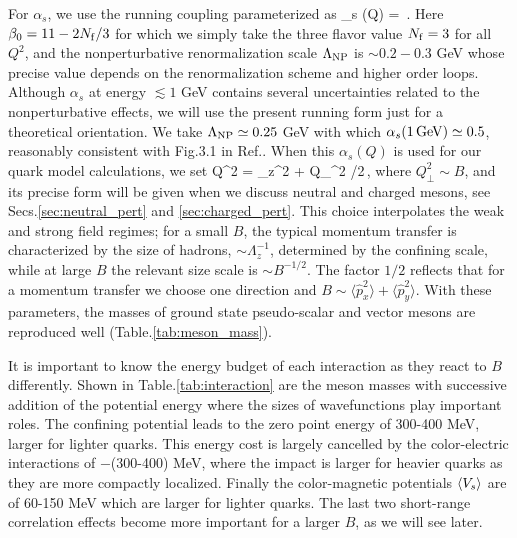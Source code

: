  For $\alpha_s$, we use the running coupling parameterized as
%
\beq
\alpha_s (Q) =  %
 \,.
\eeq
%
Here $\beta_0 = 11- 2N_{\rm f}/3$ for which we simply take the three flavor value $N_{\rm f}=3$ for all $Q^2$, 
and the nonperturbative renormalization scale $\Lambda_{\rm NP}$ is $\sim 0.2-0.3$ GeV whose precise value depends on the renormalization scheme
and higher order loops.
Although $\alpha_s$ at energy $\lesssim 1$ GeV contains several uncertainties related to the nonperturbative effects, 
we will use the present running form just for a theoretical orientation.
We take $\Lambda_{\rm NP} \simeq 0.25$ GeV with which $\alpha_s(1\,{\rm GeV}) \simeq 0.5$, reasonably consistent with Fig.3.1 in Ref.\cite{Deur:2016tte}.
When this $\alpha_s(Q)$ is used for our quark model calculations,
we set
%
\beq
 Q^2 = \Lambda_z^2 + Q_\perp^2 /2\,,
 \label{eq:Q2}
\eeq
%
where $Q^2_\perp \sim B$, and its precise form will be given when we discuss neutral and charged mesons, see Secs.\ref{sec:neutral_pert} and \ref{sec:charged_pert}.
This choice interpolates the weak and strong field regimes;
for a small $B$, the typical momentum transfer is characterized by the size of hadrons, $\sim \Lambda_z^{-1}$, determined by the confining scale,
while at large $B$ the relevant size scale is $\sim B^{-1/2}$. 
The factor $1/2$ reflects that for a  momentum transfer we choose one direction and $B \sim \langle \hat{p}_x^2 \rangle + \langle \hat{p}_y^2 \rangle$.
With these parameters, the masses of ground state pseudo-scalar and vector mesons are reproduced well (Table.\ref{tab:meson_mass}).


It is important to know the energy budget of each interaction as they react to $B$ differently. 
Shown in Table.\ref{tab:interaction} are the meson masses with successive addition of the potential energy where the sizes of wavefunctions play important roles. 
The confining potential leads to the zero point energy of 300-400 MeV, larger for lighter quarks. This energy cost is largely cancelled by the color-electric interactions of $-$(300-400) MeV, where the impact is larger for heavier quarks as they are more compactly localized. Finally the color-magnetic potentials $\langle V_s\rangle$ are of 60-150 MeV which are larger for lighter quarks. The last two short-range correlation effects become more important for a larger $B$, as we will see later.


